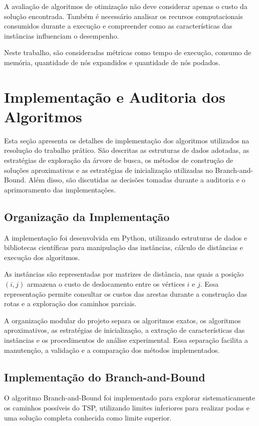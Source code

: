 \documentclass[12pt]{article}
\begin{document}
A avaliação de algoritmos de otimização não deve considerar apenas
o custo da solução encontrada. Também é necessário analisar os
recursos computacionais consumidos durante a execução e compreender
como as características das instâncias influenciam o desempenho.

Neste trabalho, são consideradas métricas como tempo de execução,
consumo de memória, quantidade de nós expandidos e quantidade de nós
podados. 	
	
	
\section{Implementação e Auditoria dos Algoritmos}

Esta seção apresenta os detalhes de implementação dos algoritmos
utilizados na resolução do trabalho prático. São descritas
as estruturas de dados adotadas, as estratégias de exploração da árvore
de busca, os métodos de construção de soluções aproximativas e as
estratégias de inicialização utilizadas no Branch-and-Bound. Além disso,  são discutidas as decisões tomadas durante a auditoria e o aprimoramento das implementações.

\subsection{Organização da Implementação}

A implementação foi desenvolvida em Python, utilizando estruturas
de dados e bibliotecas científicas para manipulação das instâncias,
cálculo de distâncias e execução dos algoritmos.

As instâncias são representadas por matrizes de distância, nas quais
a posição $(i,j)$ armazena o custo de deslocamento entre os vértices
$i$ e $j$. Essa representação permite consultar os custos das arestas
durante a construção das rotas e a exploração dos caminhos parciais.

A organização modular do projeto separa os algoritmos exatos,
os algoritmos aproximativos, as estratégias de inicialização,
a extração de características das instâncias e os procedimentos
de análise experimental. Essa separação facilita a manutenção,
a validação e a comparação dos métodos implementados.

\subsection{Implementação do Branch-and-Bound}

O algoritmo Branch-and-Bound foi implementado para explorar
sistematicamente os caminhos possíveis do TSP, utilizando limites
inferiores para realizar podas e uma solução completa conhecida
como limite superior.
\end{document}
